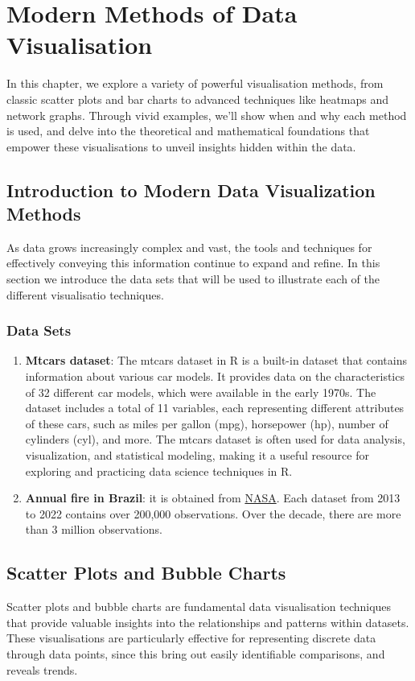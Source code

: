 \documentclass{article}\usepackage[]{graphicx}\usepackage[]{xcolor}
\begin{document}
\newpage

\section{Modern Methods of Data Visualisation}
In this chapter, we explore a variety of powerful visualisation methods, from classic scatter plots and bar charts to advanced techniques like heatmaps and network graphs. Through vivid examples, we'll show when and why each method is used, and delve into the theoretical and mathematical foundations that empower these visualisations to unveil insights hidden within the data.

\subsection{Introduction to Modern Data Visualization Methods}
As data grows increasingly complex and vast, the tools and techniques for effectively conveying this information continue to expand and refine. In this section we introduce the data sets that will be used to illustrate each of the different visualisatio techniques. 

\subsubsection{Data Sets}
\begin{enumerate}
\item \textbf{Mtcars dataset}: The mtcars dataset in R is a built-in dataset that contains information about various car models. It provides data on the characteristics of 32 different car models, which were available in the early 1970s. The dataset includes a total of 11 variables, each representing different attributes of these cars, such as miles per gallon (mpg), horsepower (hp), number of cylinders (cyl), and more. The mtcars dataset is often used for data analysis, visualization, and statistical modeling, making it a useful resource for exploring and practicing data science techniques in R.\\
\item \textbf{Annual fire in Brazil}: it is obtained from \href{https://firms.modaps.eosdis.nasa.gov/}{NASA}. Each dataset from 2013 to 2022 contains over 200,000 observations. Over the decade, there are more than 3 million observations.\\
\end{enumerate}

\subsection{Scatter Plots and Bubble Charts}
Scatter plots and bubble charts are fundamental data visualisation techniques that provide valuable insights into the relationships and patterns within datasets. These visualisations are particularly effective for representing discrete data through data points, since this bring out easily identifiable comparisons, and reveals trends.
\end{document}
